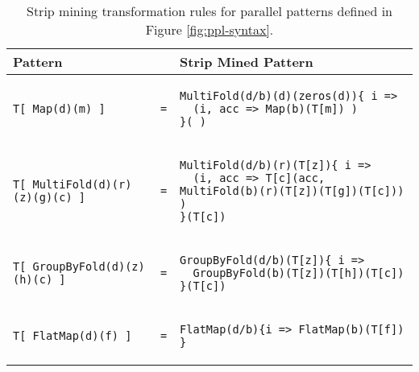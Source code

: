 \begin{table}
\small\centering
\begin{tabular}{@{}lll@{}}
\toprule
{\bf Pattern }    & { }  & {\bf Strip Mined Pattern} \\ \midrule
{\begin{lstlisting}[mathescape=true,numbers=none,basicstyle=\fontsize{8}{8}\selectfont\tt]
T[ Map(d)(m) ]
\end{lstlisting}
} & \texttt{=} &
{\begin{lstlisting}[mathescape=true,numbers=none,basicstyle=\fontsize{8}{8}\selectfont\tt]
MultiFold(d/b)(d)(zeros(d)){ i =>
  (i, acc => Map(b)(T[m]) )
}(_)
\end{lstlisting}
} \\ \midrule
{\begin{lstlisting}[mathescape=true,numbers=none,basicstyle=\fontsize{8}{8}\selectfont\tt]
T[ MultiFold(d)(r)(z)(g)(c) ]
\end{lstlisting}
} & \texttt{=} &
{\begin{lstlisting}[mathescape=true,numbers=none,basicstyle=\fontsize{8}{8}\selectfont\tt]
MultiFold(d/b)(r)(T[z]){ i =>
  (i, acc => T[c](acc, MultiFold(b)(r)(T[z])(T[g])(T[c])) )
}(T[c])
\end{lstlisting}
} \\ \midrule
{\begin{lstlisting}[mathescape=true,numbers=none,basicstyle=\fontsize{8}{8}\selectfont\tt]
T[ GroupByFold(d)(z)(h)(c) ]
\end{lstlisting}
} & \texttt{=} &
{\begin{lstlisting}[mathescape=true,numbers=none,basicstyle=\fontsize{8}{8}\selectfont\tt]
GroupByFold(d/b)(T[z]){ i =>
  GroupByFold(b)(T[z])(T[h])(T[c])
}(T[c])
\end{lstlisting}
} \\ \midrule
{\begin{lstlisting}[mathescape=true,numbers=none,basicstyle=\fontsize{8}{8}\selectfont\tt]
T[ FlatMap(d)(f) ]
\end{lstlisting}
} & \texttt{=} &
{\begin{lstlisting}[mathescape=true,numbers=none,basicstyle=\fontsize{8}{8}\selectfont\tt]
FlatMap(d/b){i => FlatMap(b)(T[f]) }
\end{lstlisting}
} \\ \bottomrule
\end{tabular}
\caption{Strip mining transformation rules for parallel patterns defined in Figure \ref{fig:ppl-syntax}.}
\label{table:stripmining}
\end{table}
